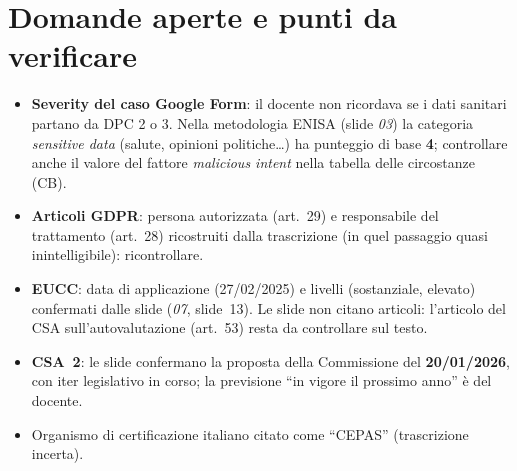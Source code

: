 \section{Domande aperte e punti da verificare}
\begin{verifica}
\begin{itemize}
  \item \textbf{Severity del caso Google Form}: il docente non ricordava se i dati sanitari partano da DPC 2 o
    3. Nella metodologia ENISA (slide \emph{03}) la categoria \emph{sensitive data} (salute, opinioni
    politiche\ldots) ha punteggio di base \textbf{4}; controllare anche il valore del fattore
    \emph{malicious intent} nella tabella delle circostanze (CB).
  \item \textbf{Articoli GDPR}: persona autorizzata (art.~29) e responsabile del trattamento (art.~28)
    ricostruiti dalla trascrizione (in quel passaggio quasi inintelligibile): ricontrollare.
  \item \textbf{EUCC}: data di applicazione (27/02/2025) e livelli (sostanziale, elevato) confermati dalle
    slide (\emph{07}, slide~13). Le slide non citano articoli: l'articolo del CSA sull'autovalutazione
    (art.~53) resta da controllare sul testo.
  \item \textbf{CSA~2}: le slide confermano la proposta della Commissione del \textbf{20/01/2026}, con iter
    legislativo in corso; la previsione ``in vigore il prossimo anno'' è del docente.
  \item Organismo di certificazione italiano citato come ``CEPAS'' (trascrizione incerta).
\end{itemize}
\end{verifica}
